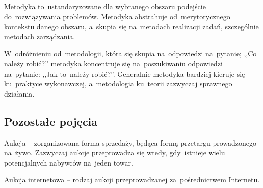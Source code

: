 \begin{definition}[Metodyka] \label{definicje.inz_op.metodyka}
Metodyka to~ustandaryzowane dla wybranego obszaru podejście do~rozwiązywania problemów. Metodyka abstrahuje od~merytorycznego kontekstu danego obszaru, a~skupia się na~metodach realizacji zadań, szczególnie metodach zarządzania.


W~odróżnieniu od~metodologii, która się skupia na~odpowiedzi na~pytanie; ,,Co należy robić?'' metodyka koncentruje się na~poszukiwaniu odpowiedzi na~pytanie: ,,Jak to~należy robić?''. Generalnie metodyka bardziej kieruje się ku~praktyce wykonawczej, a~metodologia ku~teorii zazwyczaj sprawnego działania.
\end{definition}

\subsection{Pozostałe pojęcia}

\begin{definition}[Aukcja] \label{definicje.inne.aukcja}
Aukcja -- zorganizowana forma sprzedaży, będąca formą przetargu prowadzonego na~żywo. Zazwyczaj aukcje przeprowadza się wtedy, gdy~istnieje wielu potencjalnych nabywców na~jeden towar.


Aukcja internetowa -- rodzaj aukcji przeprowadzanej za~pośrednictwem Internetu.
\end{definition}
